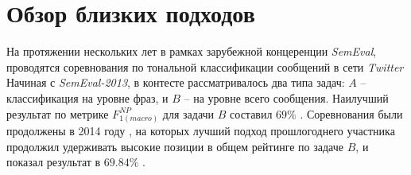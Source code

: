 \section{Обзор близких подходов}
    \label{sec:review}








    На протяжении нескольких лет в рамках зарубежной концеренции {\it SemEval},
    проводятся соревнования по тональной классификации сообщений в сети {\it Twitter}
    Начиная с {\it SemEval-2013}, в контесте рассматривалось два типа задач: $A$
    -- классификация на уровне фраз, и $B$ -- на уровне всего сообщения.
    Наилучший результат по метрике $F_{1(macro)}^{NP}$ для задачи $B$ составил
    $69\%$ \cite{semEval2013}.
    Соревнования были продолжены в 2014 году \cite{semEval2014}, на которых
    лучший подход прошлогоднего участника продолжил удерживать высокие позиции в
    общем рейтинге по задаче $B$, и показал результат в $69.84\%$
    \cite{modernApproach}.

